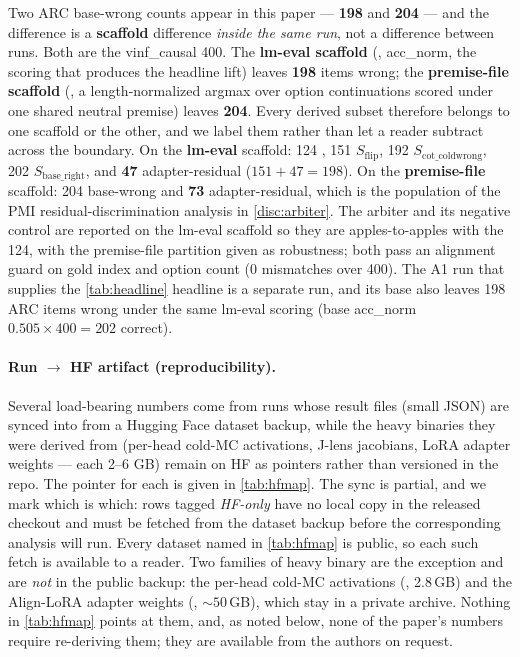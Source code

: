 Two ARC base-wrong counts appear in this paper --- \textbf{198} and \textbf{204}
--- and the difference is a \textbf{scaffold} difference \emph{inside the same run},
not a difference between runs. Both are the vinf\_causal 400. The \textbf{lm-eval
scaffold} (, acc\_norm, the scoring that produces the headline
lift) leaves \textbf{198} items wrong; the \textbf{premise-file scaffold}
(, a length-normalized argmax over option
continuations scored under one shared neutral premise) leaves \textbf{204}. Every
derived subset therefore belongs to one scaffold or the other, and we label them
rather than let a reader subtract across the boundary. On the \textbf{lm-eval}
scaffold: 124 , 151 $S_{\mathrm{flip}}$, 192
$S_{\mathrm{cot\_coldwrong}}$, 202 $S_{\mathrm{base\_right}}$, and \textbf{47}
adapter-residual ($151 + 47 = 198$). On the \textbf{premise-file} scaffold: 204
base-wrong and \textbf{73} adapter-residual, which is the population of the PMI
residual-discrimination analysis in \cref{disc:arbiter}. The arbiter and its
negative control are reported on the lm-eval scaffold so they are apples-to-apples
with the 124, with the premise-file partition given as robustness; both pass an
alignment guard on gold index and option count (0 mismatches over 400). The A1 run
that supplies the \cref{tab:headline} headline is a separate run, and its base also
leaves 198 ARC items wrong under the same lm-eval scoring (base acc\_norm
$0.505 \times 400 = 202$ correct).

\paragraph{Run $\rightarrow$ HF artifact (reproducibility).}
Several load-bearing numbers come from runs whose result files (small JSON) are
synced into  from a Hugging Face dataset backup, while the heavy
binaries they were derived from (per-head cold-MC activations, J-lens jacobians,
LoRA adapter weights --- each 2--6 GB) remain on HF as pointers rather than
versioned in the repo. The pointer for each is given in \cref{tab:hfmap}. The sync is
partial, and we mark which is which: rows tagged \emph{HF-only} have no local copy in
the released checkout and must be fetched from the dataset backup before the
corresponding analysis will run. Every dataset named in \cref{tab:hfmap} is public, so
each such fetch is available to a reader. Two families of heavy binary are the
exception and are \emph{not} in the public backup: the per-head cold-MC activations
(, 2.8\,GB) and the
Align-LoRA adapter weights (,
${\sim}50$\,GB), which stay in a private archive. Nothing in \cref{tab:hfmap} points at
them, and, as noted below, none of the paper's numbers require re-deriving them; they are
available from the authors on request.

